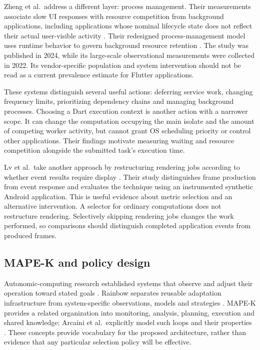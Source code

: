 \documentclass[14pt,a4paper,oneside]{extreport}
\begin{document}
Zheng et al.~address a different layer: process management. Their measurements associate
slow UI responses with resource competition from background applications, including
applications whose nominal lifecycle state does not reflect their actual user-visible
activity \citep[Secs. 3--4]{zheng2024process}. Their redesigned process-management model
uses runtime behavior to govern background resource retention
\citep[Secs. 5--6]{zheng2024process}. The study was published in 2024, while its
large-scale observational measurements were collected in 2022. Its vendor-specific
population and system intervention should not be read as a current prevalence estimate for
Flutter applications.

These systems distinguish several useful actions: deferring service work, changing frequency
limits, prioritizing dependency chains and managing background processes. Choosing a Dart
execution context is another action with a narrower scope. It can change the computation
occupying the main isolate and the amount of competing worker activity, but cannot grant
OS scheduling priority or control other applications. Their findings motivate measuring
waiting and resource competition alongside the submitted task's execution time.

Lv et al.~take another approach by restructuring rendering jobs according to whether event
results require display \citep{lv2025}. Their study distinguishes frame production from event
response and evaluates the technique using an instrumented synthetic Android application. This
is useful evidence about metric selection and an alternative intervention. A selector for
ordinary computations does not restructure rendering. Selectively skipping rendering jobs
changes the work performed, so comparisons should distinguish completed application events
from produced frames.

\subsection{MAPE-K and policy design}
\label{mape-k-and-policy-design}

Autonomic-computing research established systems that observe and adjust their operation
toward stated goals \citep{kephart2003}. Rainbow separates reusable adaptation infrastructure
from system-specific observations, models and strategies \citep{rainbow2004}. MAPE-K provides
a related organization into monitoring, analysis, planning, execution and shared knowledge;
Arcaini et al.~explicitly model such loops and their properties \citep{arcaini2015}. These
concepts provide vocabulary for the proposed architecture, rather than evidence that any
particular selection policy will be effective.
\end{document}

